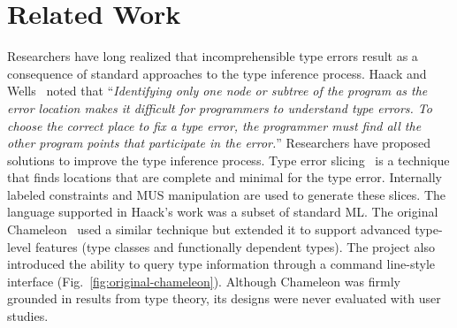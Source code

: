 \section{Related Work}

Researchers have long realized that incomprehensible type errors result as a consequence of standard approaches to the type inference process. Haack and Wells~\cite{haack2004type} noted that ``\textit{Identifying only one node or subtree of the program as the error location makes it difficult for programmers to understand type errors. To choose the correct place to fix a type error, the programmer must find all the other program points that participate in the error.}'' Researchers have proposed solutions to improve the type inference process. Type error slicing~\cite{haack2004type} is a technique that finds locations that are complete and minimal for the type error. Internally labeled constraints and MUS manipulation are used to generate these slices. The language supported in Haack's work was a subset of standard ML. The original Chameleon~\cite{stuckey2003interactive} used a similar technique but extended it to support advanced type-level features (type classes and functionally dependent types). The project also introduced the ability to query type information through a command line-style interface (Fig.~\ref{fig:original-chameleon}). Although Chameleon was firmly grounded in results from type theory, its designs were never evaluated with user studies.





